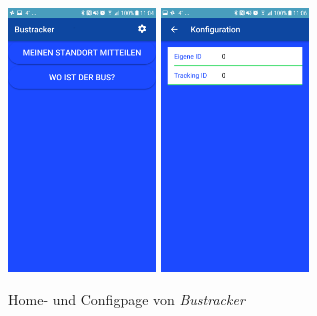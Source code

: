 \begin{figure}[htbp] 
	\centering
	\includegraphics[width=0.35\textwidth]{images/Homepage.png}
	\includegraphics[width=0.35\textwidth]{images/Configpage.png}
	\caption{Home-  und Configpage von \emph{Bustracker}}
	\label{fig:Screens}
\end{figure}
